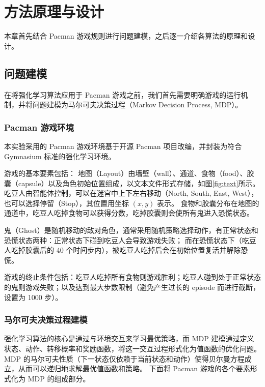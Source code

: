 \section{方法原理与设计}

本章首先结合 Pacman 游戏规则进行问题建模，之后逐一介绍各算法的原理和设计。

\subsection{问题建模}

在将强化学习算法应用于 Pacman 游戏之前，我们首先需要明确游戏的运行机制，并将问题建模为马尔可夫决策过程（Markov Decision Process, MDP）。

\subsubsection{Pacman 游戏环境}

本实验采用的 Pacman 游戏环境基于开源 Pacman 项目改编，并封装为符合 Gymnasium 标准的强化学习环境。


游戏的基本要素包括：
地图（Layout）由墙壁（wall）、通道、食物（food）、胶囊（capsule）以及角色初始位置组成，以文本文件形式存储，如图\ref{fig:text}所示。
吃豆人由智能体控制，可以在迷宫中上下左右移动（North, South, East, West），也可以选择停留（Stop），其位置用坐标 $(x, y)$ 表示。
食物和胶囊分布在地图的通道中，吃豆人吃掉食物可以获得分数，吃掉胶囊则会使所有鬼进入恐慌状态。


鬼（Ghost）是随机移动的敌对角色，通常采用随机策略选择动作，有正常状态和恐慌状态两种：正常状态下碰到吃豆人会导致游戏失败；
而在恐慌状态下（吃豆人吃掉胶囊后的 40 个时间步内），被吃豆人吃掉后会在初始位置复活并解除恐慌。


游戏的终止条件包括：吃豆人吃掉所有食物则游戏胜利；吃豆人碰到处于正常状态的鬼则游戏失败；以及达到最大步数限制（避免产生过长的 episode 而进行截断，设置为 1000 步）。


\subsubsection{马尔可夫决策过程建模}

强化学习算法的核心是通过与环境交互来学习最优策略，而 MDP 建模通过定义状态、动作、转移概率和奖励函数，将这一交互过程形式化为值函数的优化问题。
MDP 的马尔可夫性质（下一状态仅依赖于当前状态和动作）使得贝尔曼方程成立，从而可以递归地求解最优值函数和策略。
下面将 Pacman 游戏的各个要素形式化为 MDP 的组成部分。

